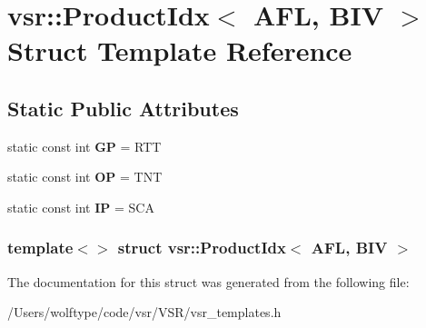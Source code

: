 \hypertarget{structvsr_1_1_product_idx_3_01_a_f_l_00_01_b_i_v_01_4}{\section{vsr\-:\-:Product\-Idx$<$ A\-F\-L, B\-I\-V $>$ Struct Template Reference}
\label{structvsr_1_1_product_idx_3_01_a_f_l_00_01_b_i_v_01_4}
}
\subsection*{Static Public Attributes}
\begin{DoxyCompactItemize}
\item 
\hypertarget{structvsr_1_1_product_idx_3_01_a_f_l_00_01_b_i_v_01_4_ad2428322d3b0ffa45e90bef9b728c7a2}{static const int {\bfseries G\-P} = R\-T\-T}\label{structvsr_1_1_product_idx_3_01_a_f_l_00_01_b_i_v_01_4_ad2428322d3b0ffa45e90bef9b728c7a2}

\item 
\hypertarget{structvsr_1_1_product_idx_3_01_a_f_l_00_01_b_i_v_01_4_a8ef10de6414db5655a42b71e1f204d3a}{static const int {\bfseries O\-P} = T\-N\-T}\label{structvsr_1_1_product_idx_3_01_a_f_l_00_01_b_i_v_01_4_a8ef10de6414db5655a42b71e1f204d3a}

\item 
\hypertarget{structvsr_1_1_product_idx_3_01_a_f_l_00_01_b_i_v_01_4_a55507792d801dc2528290e753e90688e}{static const int {\bfseries I\-P} = S\-C\-A}\label{structvsr_1_1_product_idx_3_01_a_f_l_00_01_b_i_v_01_4_a55507792d801dc2528290e753e90688e}

\end{DoxyCompactItemize}
\subsubsection*{template$<$$>$ struct vsr\-::\-Product\-Idx$<$ A\-F\-L, B\-I\-V $>$}



The documentation for this struct was generated from the following file\-:\begin{DoxyCompactItemize}
\item 
/\-Users/wolftype/code/vsr/\-V\-S\-R/vsr\-\_\-templates.\-h\end{DoxyCompactItemize}
